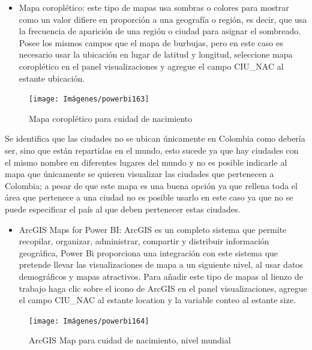 \documentclass[
]{book}
\providecommand{\tightlist}{%
  \setlength{\itemsep}{0pt}\setlength{\parskip}{0pt}}
\begin{document}
\begin{itemize}
\tightlist
\item
  Mapa coroplético: este tipo de mapas usa sombras o colores para mostrar como un valor difiere en proporción a una geografía o región, es decir, que usa la frecuencia de aparición de una región o ciudad para asignar el sombreado. Posee los mismos campos que el mapa de burbujas, pero en este caso es necesario usar la ubicación en lugar de latitud y longitud, seleccione mapa coroplético en el panel visualizaciones y agregue el campo CIU\_NAC al estante ubicación.
\end{itemize}

\begin{figure}

{\centering \texttt{[image: Imágenes/powerbi163]} 

}

\caption{Mapa coroplético para cuidad de nacimiento}\label{fig:maparelleno-fig}
\end{figure}

Se identifica que las ciudades no se ubican únicamente en Colombia como debería ser, sino que están repartidas en el mundo, esto sucede ya que hay ciudades con el mismo nombre en diferentes lugares del mundo y no es posible indicarle al mapa que únicamente se quieren visualizar las ciudades que pertenecen a Colombia; a pesar de que este mapa es una buena opción ya que rellena toda el área que pertenece a una ciudad no es posible usarlo en este caso ya que no se puede especificar el país al que deben pertenecer estas ciudades.

\begin{itemize}
\tightlist
\item
  ArcGIS Maps for Power BI: ArcGIS es un completo sistema que permite recopilar, organizar, administrar, compartir y distribuir información geográfica, Power Bi proporciona una integración con este sistema que pretende llevar las visualizaciones de mapa a un siguiente nivel, al usar datos demográficos y mapas atractivos. Para añadir este tipo de mapas al lienzo de trabajo haga clic sobre el icono de ArcGIS en el panel visualizaciones, agregue el campo CIU\_NAC al estante location y la variable conteo al estante size.
\end{itemize}

\begin{figure}

{\centering \texttt{[image: Imágenes/powerbi164]} 

}

\caption{ArcGIS Map para cuidad de nacimiento, nivel mundial}\label{fig:mapaarcgis-fig}
\end{figure}
\end{document}
